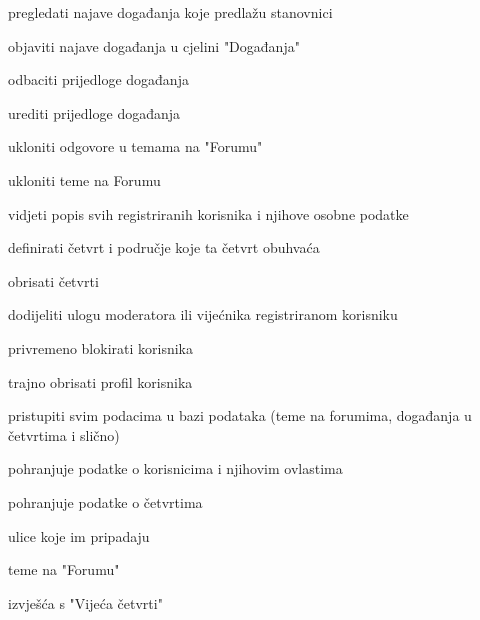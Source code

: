 \begin{packed_enum}
				\item  {}
				\begin{packed_enum}
					\item pregledati najave događanja koje predlažu stanovnici
					\item objaviti najave događanja u cjelini "Događanja"
					\item odbaciti prijedloge događanja
					\item urediti prijedloge događanja
					\item ukloniti odgovore u temama na "Forumu"
					\item ukloniti teme na Forumu
				\end{packed_enum}
				
				\item  {}
				\begin{packed_enum}
					\item vidjeti popis svih registriranih korisnika i njihove osobne podatke
					\item definirati četvrt i područje koje ta četvrt obuhvaća
					\item obrisati četvrti
					\item dodijeliti ulogu moderatora ili vijećnika registriranom korisniku
					\item privremeno blokirati korisnika
					\item trajno obrisati profil korisnika
					\item pristupiti svim podacima u bazi podataka (teme na forumima, događanja u četvrtima i slično)	
				\end{packed_enum}
				
				\item  {}
				\begin{packed_enum}
					\item pohranjuje podatke o korisnicima i njihovim ovlastima
					\item pohranjuje podatke o četvrtima
					\begin{packed_enum}
						\item ulice koje im pripadaju
						\item teme na "Forumu"
						\item izvješća s "Vijeća četvrti"
					\end{packed_enum}
				\end{packed_enum}
				
			\end{packed_enum}
			
